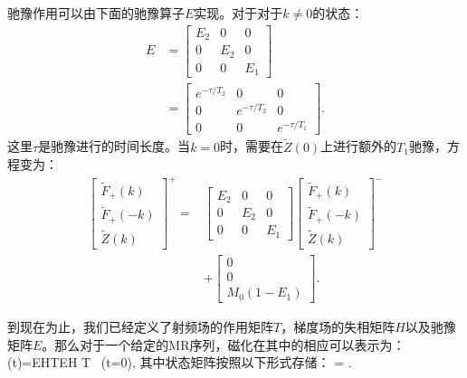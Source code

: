  驰豫作用可以由下面的驰豫算子$E$实现。对于对于$k\neq 0$的状态：
  \begin{align}
 E&=
  \left[
  \begin{matrix}
   {E}_2 & 0 & 0 \\
   0 & {E}_2 & 0 \\
   0 & 0 & {E}_1
   \end{matrix}
   \right] \nonumber\\ &=
   \left[
  \begin{matrix}
   e^{-\tau/T_2} & 0 & 0 \\
   0 & e^{-\tau/T_2} & 0 \\
   0 & 0 & e^{-\tau/T_1}
   \end{matrix}
   \right].
 \end{align}
  这里$\tau$是驰豫进行的时间长度。当$k=0$时，需要在$\tilde{Z}(0)$上进行额外的$T_1$驰豫，方程变为：
 \begin{align}
 \left[
  \begin{matrix}
   \tilde{F}_+(k) \\
   \tilde{F}_+(-k) \\
   \tilde{Z}(k)
   \end{matrix}
   \right]^+
   =&
   \left[
  \begin{matrix}
   {E}_2 & 0 & 0 \\
   0 & {E}_2 & 0 \\
   0 & 0 & {E}_1
   \end{matrix}
   \right] \left[
  \begin{matrix}
   \tilde{F}_+(k) \\
   \tilde{F}_+(-k) \\
   \tilde{Z}(k)
   \end{matrix}
   \right]^- \nonumber\\
   & +
   \left[
  \begin{matrix}
   0 \\
   0 \\
   M_0(1-E_1)
   \end{matrix}
   \right].
 \end{align}
 
 到现在为止，我们已经定义了射频场的作用矩阵$T$，梯度场的失相矩阵$H$以及驰豫矩阵$E$。那么对于一个给定的MR序列，磁化在其中的相应可以表示为：
 \beq \Gamma(t)=\cdots E\cdot H\cdot T\cdot E\cdot H
 \cdot T \cdot \Gamma\ (t=0),\eeq 
 其中状态矩阵按照以下形式存储：
 \beq 
 \Gamma=
 .
 \eeq 

